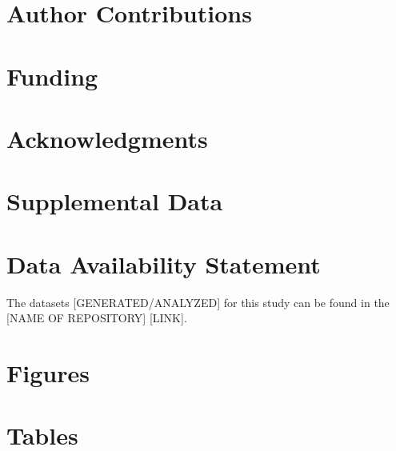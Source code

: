 \documentclass[utf8]{article}
\begin{document}
\section*{Author Contributions}

\section*{Funding}

\section*{Acknowledgments}

\section*{Supplemental Data}

\section*{Data Availability Statement}
The datasets [GENERATED/ANALYZED] for this study can be found in the [NAME OF REPOSITORY] [LINK].
\clearpage
\section*{Figures}
\clearpage
\section*{Tables}
\end{document}
